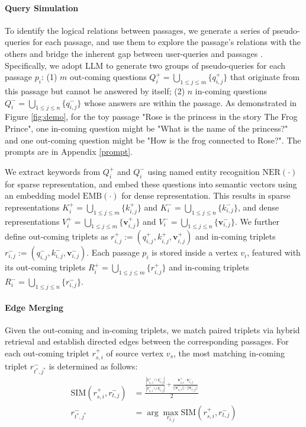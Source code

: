 \paragraph{Query Simulation}
To identify the logical relations between passages, we generate a series of pseudo-queries for each passage, and use them to explore the passage's relations with the others and bridge the inherent gap between user-queries and passages \citep{wang_qaencoder_2024}. Specifically, we adopt LLM to generate two groups of pseudo-queries for each passage $p_i$: (1) $m$ out-coming questions $Q_i^+= \bigcup_{1 \le j \le m} \{q_{i,j}^{+} \}$ that originate from this passage but cannot be answered by itself; (2) $n$ in-coming questions $Q_i^-= \bigcup_{1 \le j \le n} \{q_{i,j}^{-}\}$ whose answers are within the passage. As demonstrated in Figure \ref{fig:demo}, for the toy passage "Rose is the princess in the story The Frog Prince", one in-coming question might be "What is the name of the princess?" and one out-coming question might be "How is the frog connected to Rose?". The prompts are in Appendix \ref{prompt}. 

We extract keywords from $Q_i^+$ and $Q_i^-$ using named entity recognition $\text{NER}(\cdot)$ for sparse representation, and embed these questions into semantic vectors using an embedding model $\text{EMB}(\cdot)$ for dense representation. This results in sparse representations $K_i^+= \bigcup_{1 \le j \le m}\{k_{i,j}^{+} \}$ and $K_i^-= \bigcup_{1 \le j \le n}\{k_{i,j}^{-}\}$, and dense representations $V_i^+=\bigcup_{1 \le j \le m} \{\mathbf{v}_{i,j}^{+}\}$ and $V_i^-=\bigcup_{1 \le j \le n} \{\mathbf{v}_{i,j}^{-}\}$. We further define out-coming triplets as $r_{i,j}^+:=(q_{i,j}^{+},k_{i,j}^{+},\mathbf{v}_{i,j}^{+})$ and in-coming triplets $r_{i,j}^-:=(q_{i,j}^{-},k_{i,j}^{-},\mathbf{v}_{i,j}^{-})$. Each passage $p_i$ is stored inside a vertex $v_i$, featured with its out-coming triplets $R_i^+= \bigcup_{1 \le j \le m} \{r_{i,j}^{+}\}$ and in-coming triplets $R_i^-= \bigcup_{1 \le j \le n} \{r_{i,j}^{-} \}$. 

\paragraph{Edge Merging}
Given the out-coming and in-coming triplets, we match paired triplets via hybrid retrieval and establish directed edges between the corresponding passages.
For each out-coming triplet $r_{s,i}^+$ of source vertex $v_s$, the most matching in-coming triplet $r_{t^*,j^*}^-$ is determined as follows:
\begin{equation}
\label{sim}
\begin{aligned}
    \text{SIM}(r_{s,i}^{+}, r_{t,j}^{-}) &= \frac{\frac{|k_{s,i}^{+} \cap k_{t,j}^{-}|}{|k_{s,i}^{+} \cup k_{t,j}^{-}|}+\frac{\mathbf{v}_{s,i}^{+} \cdot \mathbf{v}_{t,j}^{-}}{||\mathbf{v}_{s,i}^{+}|| \cdot ||\mathbf{v}_{t,j}^{-}||}}{2} \\
    r_{t^*,j^*}^- &= \arg\max_{r_{t,j}^{-}  } \text{SIM}(r_{s,i}^{+}, r_{t,j}^{-})
\end{aligned}
\end{equation}

